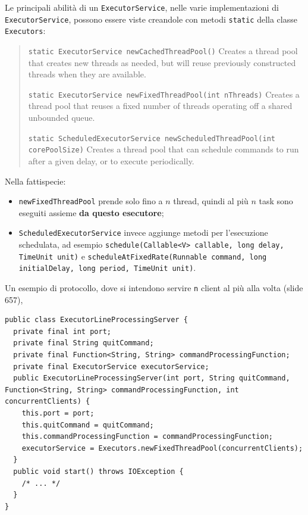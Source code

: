 \documentclass[\fontsizeclass,twocolumn]{\classname}
\theoremstyle{definition}
\theoremstyle{definition}
\begin{document}
Le principali abilità di un \texttt{ExecutorService}, nelle varie
implementazioni di \texttt{ExecutorService}, possono essere viste creandole con
metodi \texttt{static} della classe \texttt{Executors}:

\begin{quote}
    \footnotesize{\texttt{static ExecutorService 	newCachedThreadPool()} 	Creates a thread pool that creates new threads as needed, but will reuse previously constructed threads when they are available.

\texttt{static ExecutorService 	newFixedThreadPool(int nThreads)} 	Creates a thread pool that reuses a fixed number of threads operating off a shared unbounded queue.

\texttt{static ScheduledExecutorService 	newScheduledThreadPool(int corePoolSize)} 	Creates a thread pool that can schedule commands to run after a given delay, or to execute periodically.}
\end{quote}

Nella fattispecie:
\begin{itemize}
    \item \texttt{newFixedThreadPool} prende solo fino a $n$ thread, quindi al
        più $n$ task sono eseguiti assieme \textbf{da questo esecutore};
    \item \texttt{ScheduledExecutorService} invece aggiunge metodi per
        l'esecuzione schedulata, ad esempio \texttt{schedule(Callable<V>
        callable, long delay, TimeUnit unit)} e
        \texttt{scheduleAtFixedRate(Runnable command, long i\-ni\-tial\-De\-lay, long
        period, TimeUnit unit)}.
\end{itemize}

Un esempio di protocollo, dove si intendono servire \texttt{n} client al più
alla volta (slide 657),

\begin{lstlisting}
public class ExecutorLineProcessingServer {
  private final int port;
  private final String quitCommand;
  private final Function<String, String> commandProcessingFunction;
  private final ExecutorService executorService;
  public ExecutorLineProcessingServer(int port, String quitCommand, Function<String, String> commandProcessingFunction, int concurrentClients) {
    this.port = port;
    this.quitCommand = quitCommand;
    this.commandProcessingFunction = commandProcessingFunction;
    executorService = Executors.newFixedThreadPool(concurrentClients);
  }
  public void start() throws IOException {
    /* ... */
  }
}
\end{lstlisting}
\end{document}
